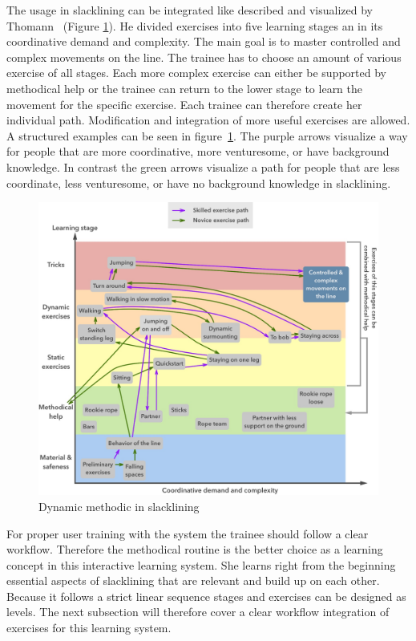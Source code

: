 The usage in slacklining can be integrated like described and visualized by Thomann~\cite{Thomann2013-aa} (Figure \ref{fig:3_3_1_dynamicMethod}). He divided exercises into five learning stages an in its coordinative demand and complexity. The main goal is to master controlled and complex movements on the line. The trainee has to choose an amount of various exercise of all stages. Each more complex exercise can either be supported by methodical help or the trainee can return to the lower stage to learn the movement for the specific exercise. Each trainee can therefore create her individual path. Modification and integration of more useful exercises are allowed. A structured examples can be seen in figure~\ref{fig:3_3_1_dynamicMethod}. The purple arrows visualize a way for people that are more coordinative, more venturesome, or have background knowledge. In contrast the green arrows visualize a path for people that are less coordinate, less venturesome, or have no background knowledge in slacklining.
\begin{figure}[htb]
	\centering
	\begin{minipage}[t]{1\linewidth}
		\centering
		\includegraphics[width=1\linewidth]{Pictures/3_3_1_dynamicMethodBoth2}
		\caption{Dynamic methodic in slacklining~\cite{Thomann2013-aa}}
		\label{fig:3_3_1_dynamicMethod}
	\end{minipage}
\end{figure}

For proper user training with the system the trainee should follow a clear workflow. Therefore the methodical routine is the better choice as a learning concept in this interactive learning system. She learns right from the beginning essential aspects of slacklining that are relevant and build up on each other. Because it follows a strict linear sequence stages and exercises can be designed as levels. 
The next subsection \textit{} will therefore cover a clear workflow integration of exercises for this learning system.

